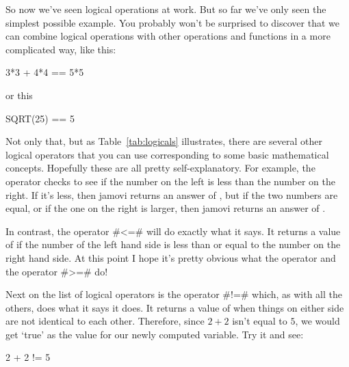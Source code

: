 
So now we've seen logical operations at work. But so far we've only seen the simplest possible example. You probably won't be surprised to discover that we can combine logical operations with other operations and functions in a more complicated way, like this:
\begin{rblock1}
3*3 + 4*4 == 5*5
\end{rblock1} 
or this
\begin{rblock1}
SQRT(25) == 5
\end{rblock1}
Not only that, but as Table~\ref{tab:logicals} illustrates, there are several other logical operators that you can use corresponding to some basic mathematical concepts. Hopefully these are all pretty self-explanatory. For example, the  operator \rtext{<} checks to see if the number on the left is less than the number on the right. If it's less, then jamovi returns an answer of , but if the two numbers are equal, or if the one on the right is larger, then jamovi returns an answer of .

In contrast, the  operator \rtextverb#<=# will do exactly what it says. It returns a value of  if the number of the left hand side is less than or equal to the number on the right hand side. At this point I hope it's pretty obvious what the  operator \rtext{>} and the  operator \rtextverb#>=# do! 

Next on the list of logical operators is the  operator \rtextverb#!=# which, as with all the others, does what it says it does. It returns a value of  when things on either side are not identical to each other. Therefore, since $2+2$ isn't equal to $5$, we would get `true' as the value for our newly computed variable. Try it and see:
\begin{rblock1}
2 + 2 != 5
\end{rblock1}

